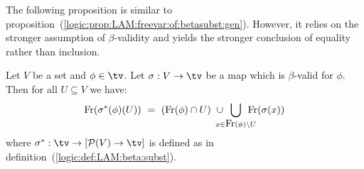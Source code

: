 The following proposition is similar to 
proposition~(\ref{logic:prop:LAM:freevar:of:betasubst:gen}). However,
it relies on the stronger assumption of $\beta$-validity and yields the
stronger conclusion of equality rather than inclusion.

\begin{prop}\label{logic:prop:LAM:freevar:of:betasubst:gen:valid}
    Let $V$ be a set and $\phi\in\tv$. Let $\sigma:V\to\tv$ be a map 
    which is $\beta$-valid for $\phi$. Then for all $U\subseteq V$ we have:
    \[
        \free(\sigma^{*}(\phi)(U)) 
            \ =\ 
        (\free(\phi)\cap U)
        \ \cup
        \!\!\!\!\!\!
        \bigcup_{x\in\free(\phi)\setminus U} 
        \!\!\!\!\!\!
        \free(\sigma(x))
    \]
    where $\sigma^{*}:\tv\to[{\cal P}(V)\to\tv]$ is defined as in 
    definition~(\ref{logic:def:LAM:beta:subst}).
\end{prop}
